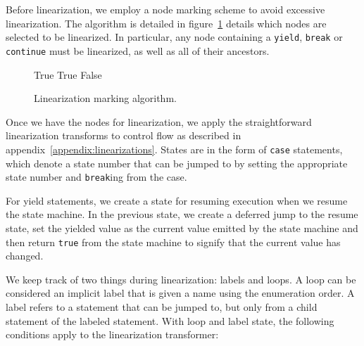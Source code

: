 \documentclass[journal,a4paper]{IEEEtran}
\begin{document}
Before linearization, we employ a node marking scheme to avoid excessive linearization. The
algorithm is detailed in figure~\ref{algorithm:mark-for-linearizing} details which nodes are
selected to be linearized. In particular, any node containing a \texttt{yield}, \texttt{break} or
\texttt{continue} must be linearized, as well as all of their ancestors.

\begin{figure}
\begin{algorithmic}
        \State {}
        \State \Return True
    \EndIf
            \State {}
        \EndIf
    \EndFor
        \State \Return True
    \Else
        \State \Return False
    \EndIf
\EndFunction\end{algorithmic}
\caption{Linearization marking algorithm.}
\label{algorithm:mark-for-linearizing}
\end{figure}

Once we have the nodes for linearization, we apply the straightforward linearization transforms to
control flow as described in appendix~\ref{appendix:linearizations}. States are in the form of
\texttt{case} statements, which denote a state number that can be jumped to by setting the
appropriate state number and \texttt{break}ing from the case.

For yield statements, we create a state for resuming execution when we resume the state machine. In
the previous state, we create a deferred jump to the resume state, set the yielded value as the
current value emitted by the state machine and then return \texttt{true} from the state machine to
signify that the current value has changed.

We keep track of two things during linearization: labels and loops. A loop can be considered an
implicit label that is given a name using the enumeration order. A label refers to a statement that
can be jumped to, but only from a child statement of the labeled statement. With loop and label
state, the following conditions apply to the linearization transformer:
\end{document}
